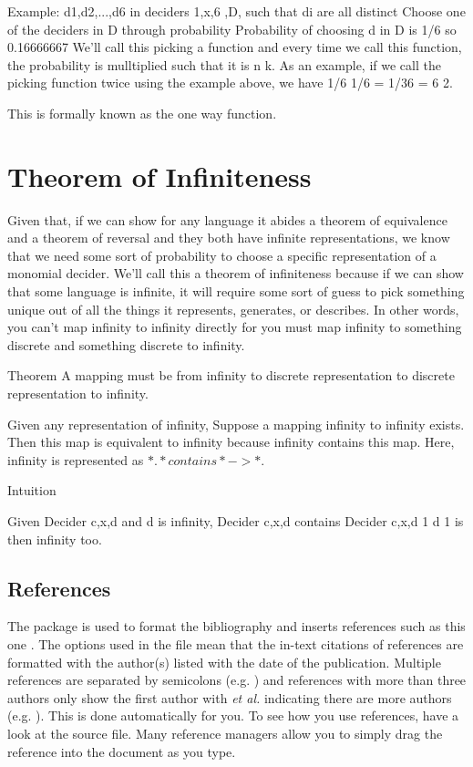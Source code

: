 Example:
d1,d2,...,d6 in deciders 1,x,6 ,D, such that di are all distinct
Choose one of the deciders in D through probability
Probability of choosing d in D is 1/6 so 0.16666667
We'll call this picking a function and every time we call this function, the probability is mulltiplied such that it is n k. As an example, if we call the picking function twice using the example above, we have 1/6 1/6 = 1/36 = 6 2.

This is formally known as the one way function.

\section{Theorem of Infiniteness}

Given that, if we can show for any language it abides a theorem of equivalence and a theorem of reversal and they both have infinite representations, we know that we need some sort of probability to choose a specific representation of a monomial decider. We'll call this a theorem of infiniteness because if we can show that some language is infinite, it will require some sort of guess to pick something unique out of all the things it represents, generates, or describes. In other words, you can't map infinity to infinity directly for you must map infinity to something discrete and something discrete to infinity.

Theorem
A mapping must be from infinity to discrete representation to discrete representation to infinity.

Given any representation of infinity,
Suppose a mapping infinity to infinity exists.
Then this map is equivalent to infinity because 
infinity contains this map.
Here, infinity is represented as $\ast. \ast contains \ast -> \ast.$

Intuition

Given Decider c,x,d and d is infinity,
Decider c,x,d contains Decider c,x,d 1
d 1 is then infinity too.


\subsection{References}

The  package is used to format the bibliography and inserts references such as this one \parencite{Reference1}. The options used in the  file mean that the in-text citations of references are formatted with the author(s) listed with the date of the publication. Multiple references are separated by semicolons (e.g. \parencite{Reference2, Reference1}) and references with more than three authors only show the first author with \emph{et al.} indicating there are more authors (e.g. \parencite{Reference3}). This is done automatically for you. To see how you use references, have a look at the  source file. Many reference managers allow you to simply drag the reference into the document as you type.

